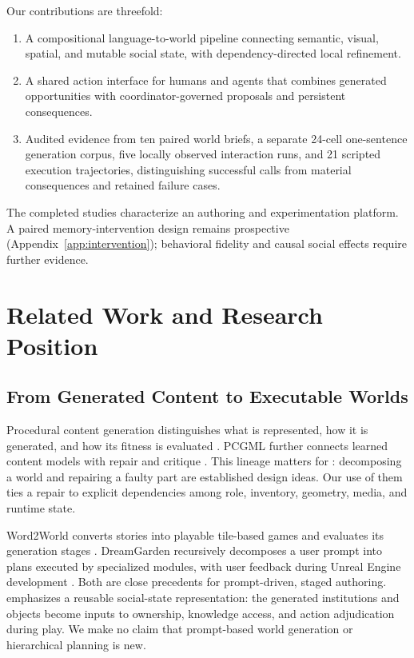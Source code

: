 Our contributions are threefold:
\begin{enumerate}
\setlength{\itemsep}{2pt}\setlength{\parskip}{0pt}
\item A compositional language-to-world pipeline connecting semantic, visual,
spatial, and mutable social state, with dependency-directed local refinement.
\item A shared action interface for humans and agents that combines generated
opportunities with coordinator-governed proposals and persistent consequences.
\item Audited evidence from ten paired world briefs, a separate 24-cell
one-sentence generation corpus, five locally observed interaction runs, and
21 scripted execution trajectories, distinguishing successful calls from
material consequences and retained failure cases.
\end{enumerate}

The completed studies characterize an authoring and experimentation platform.
A paired memory-intervention design remains prospective
(Appendix~\ref{app:intervention}); behavioral fidelity and causal social effects
require further evidence.

\section{Related Work and Research Position}
\label{sec:related}

\subsection{From Generated Content to Executable Worlds}
Procedural content generation distinguishes what is represented, how it is
generated, and how its fitness is evaluated \cite{togelius2011}. PCGML further
connects learned content models with repair and critique \cite{pcgml}. This
lineage matters for \agora: decomposing a world and repairing a faulty part are
established design ideas. Our use of them ties a repair to explicit dependencies
among role, inventory, geometry, media, and runtime state.

Word2World converts stories into playable tile-based games and evaluates its
generation stages \cite{word2world}. DreamGarden recursively decomposes a user
prompt into plans executed by specialized modules, with user feedback during
Unreal Engine development \cite{dreamgarden}. Both are close precedents for
prompt-driven, staged authoring. \agora emphasizes a reusable social-state
representation: the generated institutions and objects become inputs to
ownership, knowledge access, and action adjudication during play. We make no
claim that prompt-based world generation or hierarchical planning is new.

